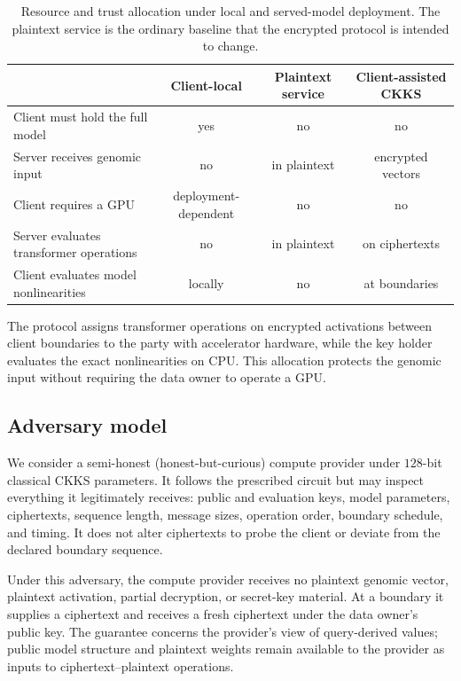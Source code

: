 \begin{table}[!tb]\centering\small
\caption{Resource and trust allocation under local and served-model deployment. The plaintext
service is the ordinary baseline that the encrypted protocol is intended to change.}
\label{tab:deployments}
\begin{tabularx}{\linewidth}{Y c c c}
\toprule
 & Client-local & Plaintext service & Client-assisted CKKS \\
\midrule
Client must hold the full model & yes & no & no \\
Server receives genomic input & no & in plaintext & encrypted vectors \\
Client requires a GPU & deployment-dependent & no & no \\
Server evaluates transformer operations & no & in plaintext & on ciphertexts \\
Client evaluates model nonlinearities & locally & no & at boundaries \\
\bottomrule
\end{tabularx}
\end{table}

The protocol assigns transformer operations on encrypted activations between client boundaries to
the party with accelerator hardware, while the key holder evaluates the exact nonlinearities on
CPU. This allocation protects the genomic input without requiring the data owner to operate a GPU.

\subsection{Adversary model}
We consider a semi-honest (honest-but-curious) compute provider under $128$-bit classical CKKS
parameters. It follows
the prescribed circuit but may inspect everything it legitimately receives: public and evaluation
keys, model parameters, ciphertexts, sequence length, message sizes, operation order, boundary
schedule, and timing. It does not alter ciphertexts to probe the client or deviate from the
declared boundary sequence.

Under this adversary, the compute provider receives no plaintext genomic vector, plaintext
activation, partial decryption, or secret-key material. At a boundary it supplies a ciphertext and
receives a fresh ciphertext under the data owner's public key. The guarantee concerns the
provider's view of query-derived values; public model structure and plaintext weights remain
available to the provider as inputs to ciphertext--plaintext operations.

